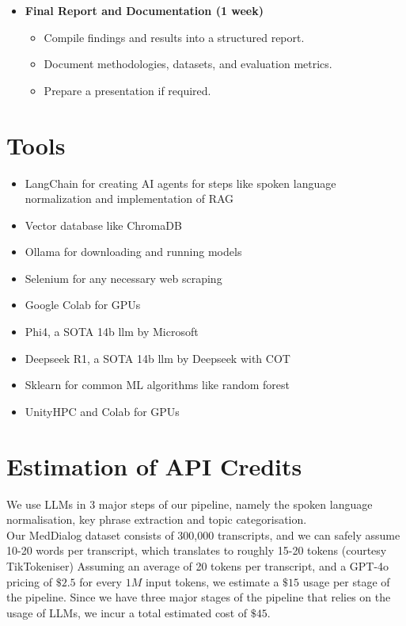 \documentclass[11pt,a4paper]{article}
\begin{document}
\begin{itemize}
    \item \textbf{Final Report and Documentation (1 week)}
    \begin{itemize}
        \item Compile findings and results into a structured report.
        \item Document methodologies, datasets, and evaluation metrics.
        \item Prepare a presentation if required.
    \end{itemize}
\end{itemize}



\section{Tools}
\begin{itemize}
  \item LangChain for creating AI agents for steps like spoken language normalization and implementation of RAG
  \item Vector database like ChromaDB
  \item Ollama for downloading and running models
  \item Selenium for any necessary web scraping
  \item Google Colab for GPUs
  \item Phi4, a SOTA 14b llm by Microsoft
  \item Deepseek R1, a SOTA 14b llm by Deepseek with COT
  \item Sklearn for common ML algorithms like random forest
  \item UnityHPC and Colab for GPUs
\end{itemize}

\section{Estimation of API Credits}
We use LLMs in 3 major steps of our pipeline, namely the spoken language normalisation, key phrase extraction and topic categorisation.\\
Our MedDialog dataset consists of 300,000 transcripts, and we can safely assume 10-20 words per transcript, which translates to roughly 15-20 tokens (courtesy TikTokeniser)  Assuming an average of 20 tokens per transcript, and a GPT-4o pricing of $\$2.5$ for every $1M$ input tokens, we estimate a $\$15$ usage per stage of the pipeline. Since we have three major stages of the pipeline that relies on the usage of LLMs, we incur a total estimated cost of $\$45$.
\end{document}
